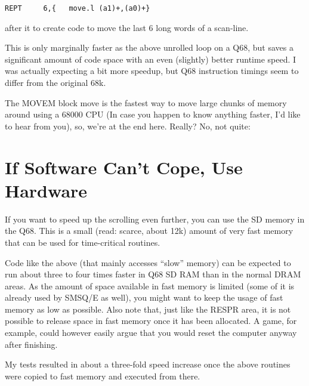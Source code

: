 \begin{lstlisting}[firstnumber=1,caption={Scrolling one pixel leftwards}]
    REPT     6,{   move.l (a1)+,(a0)+}
\end{lstlisting}

after it to create code to move the last 6 long words of a scan-line.

This is only marginally faster as the above unrolled loop on a Q68, but
saves a significant amount of code space with an even (slightly) better
runtime speed. I was actually expecting a bit more speedup, but Q68
instruction timings seem to differ from the original 68k.

The MOVEM block move is the fastest way to move large chunks of memory
around using a 68000 CPU (In case you happen to know anything faster,
I'd like to hear from you), so, we're at the end here. Really? No, not
quite:

\section{If Software Can't Cope, Use Hardware}

If you want to speed up the scrolling even further, you can use the SD
memory in the Q68. This is a small (read: scarce, about 12k) amount of
very fast memory that can be used for time-critical routines.

Code like the above (that mainly accesses ``slow'' memory) can be
expected to run about three to four times faster in Q68 SD RAM than in
the normal DRAM areas. As the amount of space available in fast memory
is limited (some of it is already used by SMSQ/E as well), you might
want to keep the usage of fast memory as low as possible. Also note
that, just like the RESPR area, it is not possible to release space in
fast memory once it has been allocated. A game, for example, could however
easily argue that you would reset the computer anyway after finishing.

My tests resulted in about a three-fold speed increase once the above
routines were copied to fast memory and executed from there.

